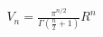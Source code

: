 \documentclass[preview]{standalone}
\begin{document}
\begin{align*}
V_n = \frac{\pi^{n/2}}{\Gamma(\frac{n}{2} + 1)} R^n
\end{align*}
\end{document}
